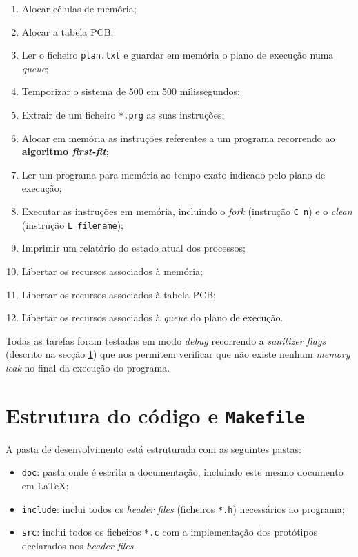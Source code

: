 \documentclass[a4paper,11pt,onecolumn,oneside]{article}
\begin{document}
	\begin{enumerate}
		\item Alocar células de memória;
		\item Alocar a tabela PCB;
		\item Ler o ficheiro \texttt{plan.txt} e guardar em memória o plano de execução numa \textit{queue};
		\item Temporizar o sistema de 500 em 500 milissegundos;
		\item Extrair de um ficheiro \texttt{*.prg} as suas instruções;
		\item Alocar em memória as instruções referentes a um programa recorrendo ao \textbf{algoritmo \textit{first-fit}};
		\item Ler um programa para memória ao tempo exato indicado pelo plano de execução;
		
		\item Executar as instruções em memória, incluindo o \textit{fork} (instrução \verb|C n|) e o \textit{clean} (instrução \verb|L filename|);
		
		
		\item Imprimir um relatório do estado atual dos processos;
		\item Libertar os recursos associados à memória;
		\item Libertar os recursos associados à tabela PCB;
		\item Libertar os recursos associados à \textit{queue} do plano de execução.
	\end{enumerate}
	
	Todas as tarefas foram testadas em modo \textit{debug} recorrendo a \textit{sanitizer flags} (descrito na secção \ref{sec:struct_makefile}) que nos permitem verificar que não existe nenhum \textit{memory leak} no final da execução do programa.
	
	
	\section{Estrutura do código e \texttt{Makefile}}
	\label{sec:struct_makefile}
	
	A pasta de desenvolvimento está estruturada com as seguintes pastas:
	
	\begin{itemize}
		\item \verb|doc|: pasta onde é escrita a documentação, incluindo este mesmo documento em \LaTeX;
		\item \verb|include|: inclui todos os \textit{header files} (ficheiros \verb|*.h|) necessários ao programa;
		\item \verb|src|: inclui todos os ficheiros \verb|*.c| com a implementação dos protótipos declarados nos \textit{header files}.
	\end{itemize}
	
\end{document}
